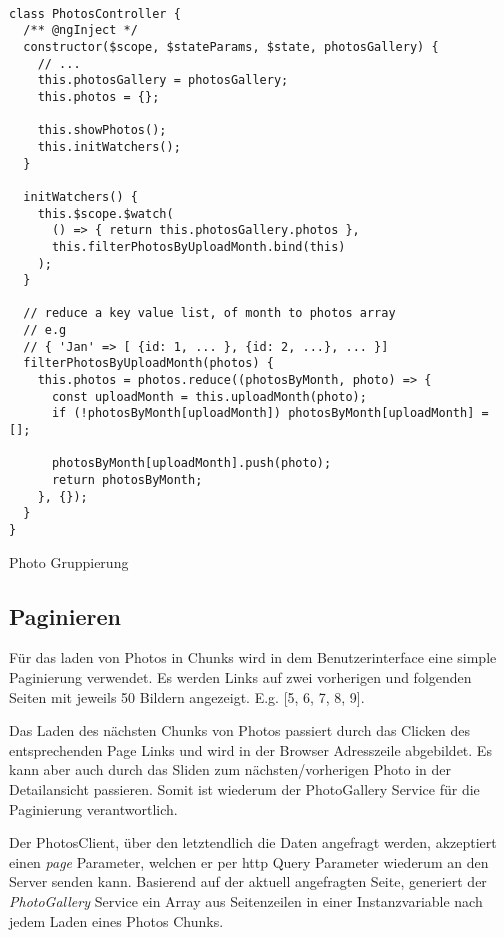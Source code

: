 \begin{listing}[H]
\begin{verbatim}

class PhotosController {
  /** @ngInject */
  constructor($scope, $stateParams, $state, photosGallery) {
    // ...
    this.photosGallery = photosGallery;
    this.photos = {};

    this.showPhotos();
    this.initWatchers();
  }

  initWatchers() {
    this.$scope.$watch(
      () => { return this.photosGallery.photos }, 
      this.filterPhotosByUploadMonth.bind(this)
    );
  }

  // reduce a key value list, of month to photos array
  // e.g
  // { 'Jan' => [ {id: 1, ... }, {id: 2, ...}, ... }]
  filterPhotosByUploadMonth(photos) {
    this.photos = photos.reduce((photosByMonth, photo) => {
      const uploadMonth = this.uploadMonth(photo);
      if (!photosByMonth[uploadMonth]) photosByMonth[uploadMonth] = [];

      photosByMonth[uploadMonth].push(photo);
      return photosByMonth;
    }, {});
  }
}

\end{verbatim}
\caption{Photo Gruppierung}
\label{lst:photo_group}
\end{listing} 

\subsection{Paginieren}

Für das laden von Photos in Chunks wird in dem Benutzerinterface eine simple Paginierung verwendet. Es werden Links auf zwei vorherigen und folgenden Seiten mit jeweils 50 Bildern angezeigt. E.g. [5, 6, 7, 8, 9]. 

Das Laden des nächsten Chunks von Photos passiert durch das Clicken des entsprechenden Page Links und wird in der Browser Adresszeile abgebildet. Es kann aber auch durch das Sliden zum nächsten/vorherigen Photo in der Detailansicht passieren. Somit ist wiederum der PhotoGallery Service für die Paginierung verantwortlich.

Der PhotosClient, über den letztendlich die Daten angefragt werden, akzeptiert einen \textit{page} Parameter, welchen er per http Query Parameter wiederum an den Server senden kann. Basierend auf der aktuell angefragten Seite, generiert der \textit{PhotoGallery} Service ein Array aus Seitenzeilen in einer Instanzvariable nach jedem Laden eines Photos Chunks. 

